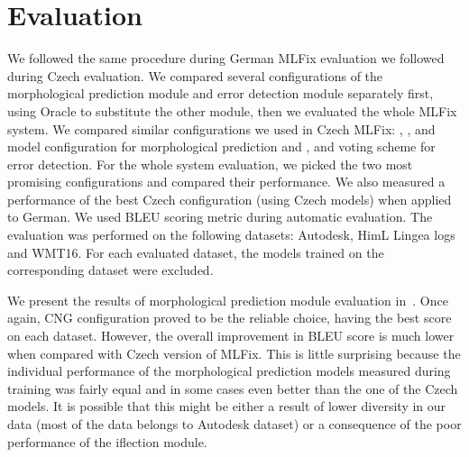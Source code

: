 \section{Evaluation}

We followed the same procedure during German MLFix evaluation we followed during
Czech evaluation. We compared several configurations of the morphological prediction
module and error detection module separately first, using Oracle to substitute the other
module, then we evaluated the whole MLFix system. We compared similar configurations
we used in Czech MLFix: , ,  and  model configuration for morphological
prediction and ,  and  voting scheme for error
detection. For the whole system evaluation, we picked the two most promising configurations
and compared their performance. We also measured a performance of the best Czech configuration
(using Czech models) when applied to German. We used BLEU scoring metric during automatic evaluation.
The evaluation was performed on the following datasets: Autodesk, HimL Lingea logs and WMT16.
For each evaluated dataset, the models trained on the corresponding dataset were excluded.

We present the results of morphological prediction module evaluation in~.
Once again, CNG configuration proved to be the reliable choice, having the best score on each dataset.
However, the overall improvement in BLEU score is much lower when compared with Czech version
of MLFix. This is little surprising because the individual performance of the morphological prediction
models measured during training was fairly equal and in some cases even better than the one of the Czech models.
It is possible that this might be either a result of lower diversity in our data (most of the data belongs
to Autodesk dataset) or a consequence of the poor performance of the iflection module.

